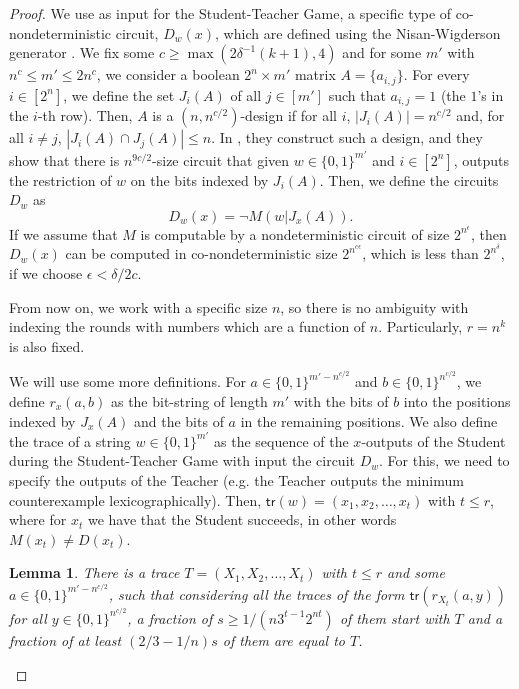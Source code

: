 \documentclass[11pt]{article}
\newtheorem{lemma}[theorem]{Lemma}
\theoremstyle{definition}
\theoremstyle{definition}
\theoremstyle{remark}
\begin{document}
\begin{proof}
    We use as input for the Student-Teacher Game, a specific type of co-nondeterministic circuit, $D_{w}(x)$, which are defined using the Nisan-Wigderson generator \cite{nw}. We fix some $c\geq \max(2\delta^{-1}(k+1),4)$ and for some $m'$ with $n^c\leq m'\leq 2n^c$, we consider a boolean $2^n\times m'$ matrix $A=\{a_{i,j}\}$. For every $i\in [2^n]$, we define the set $J_i(A)$ of all $j\in [m']$ such that $a_{i,j}=1$ (the $1$'s in the $i$-th row). Then, $A$ is a $(n,n^{c/2})$-design if for all $i$, $|J_i(A)|=n^{c/2}$ and, for all $i\neq j$, $|J_i(A)\cap J_j(A)|\leq n$. In \cite{nw}, they construct such a design, and they show that there is $n^{9c/2}$-size circuit that given $w\in \{0,1\}^{m'}$ and $i\in [2^n]$, outputs the restriction of $w$ on the bits indexed by $J_i(A)$. Then, we define the circuits $D_w$ as
    $$
    D_w(x)=\neg M(w|J_x(A)).
    $$
    If we assume that $M$ is computable by a nondeterministic circuit of size $2^{n^\epsilon}$, then $D_w(x)$ can be computed in co-nondeterministic size $2^{n^{c\epsilon}}$, which is less than $2^{n^\delta}$, if we choose $\epsilon< \delta /2c$.

    From now on, we work with a specific size $n$, so there is no ambiguity with indexing the rounds with numbers which are a function of $n$. Particularly, $r=n^k$ is also fixed.

    We will use some more definitions. For $a\in\{0,1\}^{m'-n^{c/2}}$ and $b\in \{0,1\}^{n^{c/2}}$, we define $r_x(a,b)$ as the bit-string of length $m'$ with the bits of $b$ into the positions indexed by $J_x(A)$ and the bits of $a$ in the remaining positions. We also define the trace of a string $w\in \{0,1\}^{m'}$ as the sequence of the $x$-outputs of the Student during the Student-Teacher Game with input the circuit $D_w$. For this, we need to specify the outputs of the Teacher (e.g. the Teacher outputs the minimum counterexample lexicographically). Then, $\mathsf{tr}(w)=(x_1,x_2,\dots,x_t)$ with $t\leq r$, where for $x_t$ we have that the Student succeeds, in other words $M(x_t)\neq D(x_t)$.

    \begin{lemma}\label{lem:trace}
        There is a trace $T=(X_1,X_2,\dots,X_t)$ with $t\leq r$ and some $a\in\{0,1\}^{m'-n^{c/2}}$, such that considering all the traces of the form $\mathsf{tr}(r_{X_t}(a,y))$ for all $y\in \{0,1\}^{n^{c/2}}$, a fraction of $s\geq 1/(n3^{t-1}2^{nt})$ of them start with $T$ and a fraction of at least $(2/3-1/n)s$ of them are equal to $T$.
    \end{lemma}


\end{proof}
\end{document}

